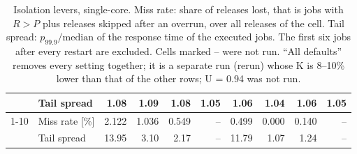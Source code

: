 \begin{table}[ht]
{\begin{tabular}{ll|rrrr|rrrr}
 & Tail spread & 1.08 & 1.09 & 1.08 & 1.05 & 1.06 & 1.04 & 1.06 & 1.05 \\
\cmidrule{1-10}
\multirow[t]{2}{*}{all defaults} & Miss rate [\%] & 2.122 & 1.036 & 0.549 & -- & 0.499 & 0.000 & 0.140 & -- \\
 & Tail spread & 13.95 & 3.10 & 2.17 & -- & 11.79 & 1.07 & 1.24 & -- \\
\bottomrule
\end{tabular}}
\caption{Isolation levers, single-core. Miss rate: share of releases lost, that is jobs with $R>P$ plus releases skipped after an overrun, over all releases of the cell. Tail spread: $p_{99.9}/\mathrm{median}$ of the response time of the executed jobs. The first six jobs after every restart are excluded. Cells marked -- were not run. ``All defaults'' removes every setting together; it is a separate run (rerun) whose K is 8--10\% lower than that of the other rows; U = 0.94 was not run.}
\label{tab:rq1-single-core}
\end{table}

